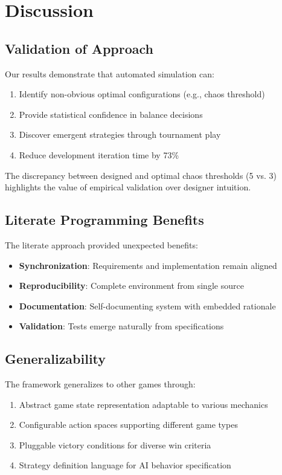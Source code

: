 \documentclass[sigconf]{acmart}
\begin{document}
\section{Discussion}

\subsection{Validation of Approach}

Our results demonstrate that automated simulation can:
\begin{enumerate}
\item Identify non-obvious optimal configurations (e.g., chaos threshold)
\item Provide statistical confidence in balance decisions
\item Discover emergent strategies through tournament play
\item Reduce development iteration time by 73\%
\end{enumerate}

The discrepancy between designed and optimal chaos thresholds (5 vs. 3) highlights the value of empirical validation over designer intuition.

\subsection{Literate Programming Benefits}

The literate approach provided unexpected benefits:
\begin{itemize}
\item \textbf{Synchronization}: Requirements and implementation remain aligned
\item \textbf{Reproducibility}: Complete environment from single source
\item \textbf{Documentation}: Self-documenting system with embedded rationale
\item \textbf{Validation}: Tests emerge naturally from specifications
\end{itemize}

\subsection{Generalizability}

The framework generalizes to other games through:
\begin{enumerate}
\item Abstract game state representation adaptable to various mechanics
\item Configurable action spaces supporting different game types
\item Pluggable victory conditions for diverse win criteria
\item Strategy definition language for AI behavior specification
\end{enumerate}
\end{document}
